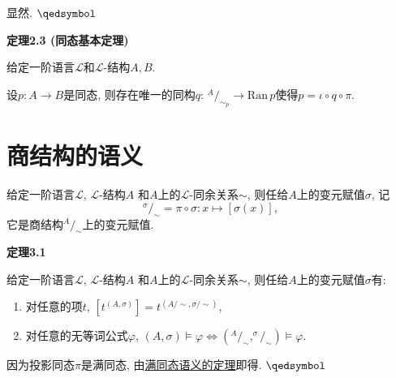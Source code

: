 \documentclass[UTF8]{ctexart}
\begin{document}
\vspace{3pt}
 显然. \hfill $\qedsymbol$

\vspace{10pt}

\hypertarget{sec:定理2.3}{}
\noindent\textbf{定理2.3 (同态基本定理)}

给定一阶语言$\mathcal{L}$和$\mathcal{L}$-结构$A,B$.

设$p:A\to B$是同态, 则存在唯一的同构$q:\,^{\displaystyle A}\!/_{\displaystyle\sim_p}
\to\mathrm{Ran}\,p$使得$p=\iota\circ q\circ\pi$.





\newpage

\section{商结构的语义}

给定一阶语言$\mathcal{L}$, $\mathcal{L}$-结构$A$
和$A$上的$\mathcal{L}$-同余关系$\sim$, 则任给$A$上的变元赋值$\sigma$, 记
\[
    ^{\displaystyle\sigma}\!/_{\displaystyle\sim}=\pi\circ\sigma:
    x\mapsto[\sigma(x)],
\]
它是商结构$^{\displaystyle A}\!/_{\displaystyle\sim}$上的变元赋值.

\vspace{10pt}

\hypertarget{sec:定理3.1}{}
\noindent\textbf{定理3.1}

给定一阶语言$\mathcal{L}$, $\mathcal{L}$-结构$A$
和$A$上的$\mathcal{L}$-同余关系$\sim$, 则任给$A$上的变元赋值$\sigma$有:
\begin{enumerate}
    \item 对任意的项$t$, $[t^{(A,\sigma)}]=t^{(A/\sim,\sigma/\sim)}$,
    \item 对任意的无等词公式$\varphi$,
    $(A,\sigma)\models\varphi\iff\left(^{\displaystyle A}\!/_{\displaystyle\sim},
    ^{\displaystyle\sigma}\!/_{\displaystyle\sim}\right)\models\varphi$.
\end{enumerate}


因为投影同态$\pi$是满同态, 由\href{02 结构的同态#nameddest=sec:定理3.4}
{满同态语义的定理}即得. \hfill $\qedsymbol$
\end{document}
